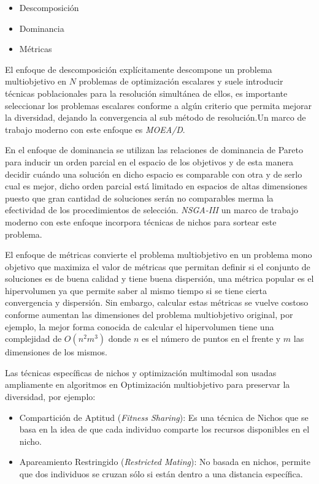 \documentclass[letterpaper,10pt]{article}
\begin{document}
\begin{itemize}
 \item Descomposición
 \item Dominancia
 \item Métricas
\end{itemize}

El enfoque de descomposición explícitamente descompone un problema multiobjetivo en $N$ problemas de optimización escalares y suele introducir técnicas poblacionales para la resolución simultánea de ellos, es importante seleccionar los problemas escalares conforme a algún criterio que permita mejorar la diversidad, dejando la convergencia al sub método de resolución.Un marco de trabajo moderno con este enfoque es \emph{MOEA/D}\cite{4358754}.
\newline

En el enfoque de dominancia se utilizan las relaciones de dominancia de Pareto para inducir un orden parcial en el espacio de los objetivos y de esta manera decidir cuándo una solución en dicho espacio es comparable con otra y de serlo cual es mejor, dicho orden parcial está limitado en espacios de altas dimensiones puesto que gran cantidad de soluciones serán no comparables merma la efectividad de los procedimientos de selección. \emph{NSGA-III} un marco de trabajo moderno con este enfoque incorpora técnicas de nichos para sortear este problema.
\newline

El enfoque de métricas convierte el problema multiobjetivo en un problema mono objetivo que maximiza el valor de métricas que permitan definir si el conjunto de soluciones es de buena calidad y  tiene buena dispersión, una métrica popular es el hipervolumen ya que permite saber al mismo tiempo si se tiene cierta convergencia y dispersión. Sin embargo, calcular estas métricas se vuelve costoso conforme aumentan las dimensiones del problema multiobjetivo original, por ejemplo, la mejor forma conocida de calcular el hipervolumen tiene una complejidad de $O(n^2m^3)$ donde $n$ es el número de puntos en el frente y $m$ las dimensiones de los mismos.
\newline

Las técnicas específicas de nichos y optimización multimodal son usadas ampliamente en algoritmos en Optimización multiobjetivo para preservar la diversidad, por ejemplo:
 \begin{itemize}
  \item Compartición de Aptitud ({\em Fitness Sharing}): Es una técnica de Nichos que se basa en la idea de que cada individuo comparte los recursos disponibles en el nicho.
  \item Apareamiento Restringido ({\em Restricted Mating}): No basada en nichos, permite que dos individuos se cruzan sólo si están dentro a una distancia específica.  
 \end{itemize}
 
\end{document}
